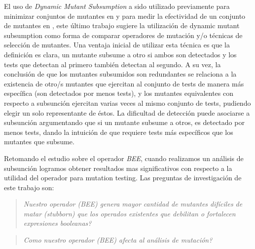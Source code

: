 El uso de \emph{Dynamic Mutant Subsumption} a sido utilizado previamente para minimizar conjuntos de mutantes en \cite{bibliography.mutation.minimizing.dynamicsubsumption} y para medir la efectividad de un conjunto de mutantes en \cite{bibliography.mutation.efectiveness.dynamicsubsumption}, este \'ultimo trabajo sugiere la utilizaci\'on de dynamic mutant subsumption como forma de comparar operadores de mutaci\'on y/o t\'ecnicas de selecci\'on de mutantes. Una ventaja inicial de utilizar esta t\'ecnica es que la definici\'on es clara, un mutante subsume a otro si ambos son detectados y los tests que detectan al primero tambi\'en detectan al segundo. A su vez, la conclusi\'on de que los mutantes subsumidos son redundantes se relaciona a la existencia de otro/s mutantes que ejercitan al conjunto de tests de manera m\'as espec\'ifica (son detectados por menos tests), y los mutantes equivalentes con respecto a subsunci\'on ejercitan varias veces al mismo conjunto de tests, pudiendo elegir un solo representante de \'estos. La dificultad de detecci\'on puede asociarse a subsunci\'on argumentando que si un mutante subsume a otros, es detectado por menos tests, dando la intuici\'on de que requiere tests m\'as espec\'ificos que los mutantes que subsume.

Retomando el estudio sobre el operador \emph{BEE}, cuando realizamos un an\'alisis de subsunci\'on logramos obtener resultados mas significativos con respecto a la utilidad del operador para mutation testing. Las preguntas de investigaci\'on de este trabajo son:
\begin{quote}
	{\it Nuestro operador (BEE) genera mayor cantidad de mutantes dif\'iciles de matar (stubborn) que los operados existentes que debilitan o fortalecen expresiones booleanas?}
\end{quote}
\begin{quote}
	{\it Como nuestro operador (BEE) afecta al an\'alisis de mutaci\'on?}
\end{quote}

